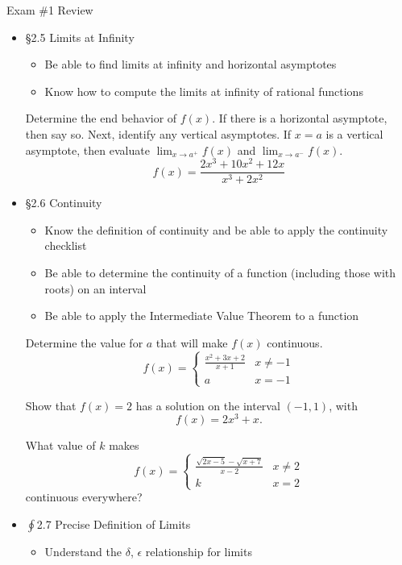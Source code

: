 \documentclass[cal1spr16Lectures.tex]{subfiles}
\begin{document}
\begin{frame}[allowframebreaks]{Exam \#1 Review}
\begin{itemize}
\begin{itemize}
	\end{itemize}
\item \S 2.5 Limits at Infinity
	\begin{itemize}\footnotesize
	\item Be able to find limits at infinity and horizontal asymptotes 
	\item Know how to compute the limits at infinity of rational functions
	\end{itemize}
\framebreak	
\begin{ex} Determine the end behavior of $f(x)$.  If there is a horizontal asymptote, then say so.  Next, identify any vertical asymptotes.  If $x=a$ is a vertical asymptote, then evaluate $\displaystyle\lim_{x\to a^+}f(x)$ and $\displaystyle\lim_{x\to a^-}f(x)$.
\[f(x)=\frac{2x^3+10x^2+12x}{x^3+2x^2}\]
\end{ex}
\framebreak
\item \S 2.6 Continuity 
	\begin{itemize}\footnotesize
	\item Know the definition of continuity and be able to apply the continuity checklist
	\item Be able to determine the continuity of a function (including those with roots) on an interval
	\item Be able to apply the Intermediate Value Theorem to a function
	\end{itemize}
\framebreak
\begin{ex} Determine the value for $a$ that will make $f(x)$ continuous. 
\[f(x)=\begin{cases}
	\frac{x^2+3x+2}{x+1} & x\neq -1 \\
	a & x=-1
	\end{cases}\]
\end{ex}
\begin{ex} Show that $f(x)=2$ has a solution on the interval $(-1,1)$, with
\[f(x)=2x^3+x.\]
\end{ex}
\framebreak
\begin{exe}
What value of $k$ makes
\[
f(x)=\begin{cases}\frac{\sqrt{2x-5}-\sqrt{x+7}}{x-2} & x\neq 2 \\
	k & x=2
	\end{cases}
\]
continuous everywhere?
\end{exe}
\item $\oint$2.7 Precise Definition of Limits 
	\begin{itemize}\footnotesize
	\item Understand the $\delta$, $\epsilon$ relationship for limits

\end{itemize}
\end{itemize}
\end{frame}
\end{document}
